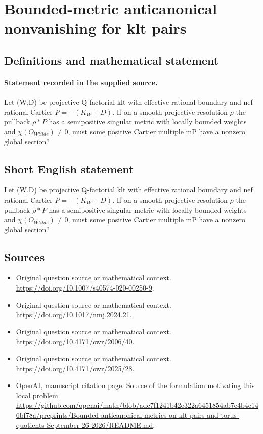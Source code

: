\documentclass[11pt]{article}
\begin{document}
\section*{Bounded-metric anticanonical nonvanishing for klt pairs}\label{statement}
\subsection{Definitions and mathematical statement}
\paragraph{Statement recorded in the supplied source.}
Let (W,D) be projective Q-factorial klt with effective rational boundary and nef rational Cartier $P=-(K_W+D)$. If on a smooth projective resolution $\rho $ the pullback $\rho *P$ has a semipositive singular metric with locally bounded weights and $\chi (O_{Wtilde})\neq 0$, must some positive Cartier multiple mP have a nonzero global section?
\subsection{Short English statement}
Let (W,D) be projective Q-factorial klt with effective rational boundary and nef rational Cartier $P=-(K_W+D)$. If on a smooth projective resolution $\rho $ the pullback $\rho *P$ has a semipositive singular metric with locally bounded weights and $\chi (O_{Wtilde})\neq 0$, must some positive Cartier multiple mP have a nonzero global section?
\subsection{Sources}
\begin{itemize}
\item[S1] Original question source or mathematical context.
\url{https://doi.org/10.1007/s40574-020-00250-9}.
\item[S2] Original question source or mathematical context.
\url{https://doi.org/10.1017/nmj.2024.21}.
\item[S3] Original question source or mathematical context.
\url{https://doi.org/10.4171/owr/2006/40}.
\item[S4] Original question source or mathematical context.
\url{https://doi.org/10.4171/owr/2025/28}.
\item[S5] OpenAI, manuscript citation page. Source of the formulation motivating this local problem.
\url{https://github.com/openai/math/blob/adc7f1241b42e322a6451854ab7e4b4c146bf78a/preprints/Bounded-anticanonical-metrics-on-klt-pairs-and-torus-quotients-September-26-2026/README.md}.
\end{itemize}
\end{document}
